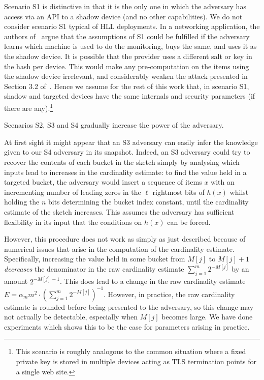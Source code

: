 \documentclass[sigconf, anonymous, dvipsnames]{acmart} %
\begin{document}
Scenario S1 is distinctive in that it is the only one in which the adversary has access via an API to a shadow device (and no other capabilities). We do not consider scenario S1 typical of HLL deployments. In a networking application, the authors of~\cite{hllvuln} argue that the assumptions of S1 could be fulfilled if the adversary learns which machine is used to do the monitoring, buys the same, and uses it as the shadow device. It is possible that the provider uses a different salt or key in the hash per device. This would make any pre-computation on the items using the shadow device irrelevant, and considerably weaken the attack presented in Section 3.2 of~\cite{hllvuln}. Hence we assume for the rest of this work that, in scenario S1, shadow and targeted devices have the same internals and security parameters (if there are any).\footnote{This scenario is roughly analogous to the common situation where a fixed private key is stored in multiple devices acting as TLS termination points for a single web site.}

Scenarios S2, S3 and S4 gradually increase the power of the adversary. 

At first sight it might appear that an S3 adversary can easily infer the knowledge given to our S4 adversary in its snapshot. Indeed, an S3 adversary could try to recover the contents of each bucket in the sketch simply by analysing which inputs lead to increases in the cardinality estimate: to find the value held in a targeted bucket, the adversary would insert a sequence of items $x$ with an incrementing number of leading zeros in the $\ell$ rightmost bits of $h(x)$ whilst holding the $n$ bits determining the bucket index constant, until the cardinality estimate of the sketch increases. This assumes the adversary has sufficient flexibility in its input that the conditions on $h(x)$ can be forced. 

However, this procedure does not work as simply as just described because of numerical issues that arise in the computation of the cardinality estimate. Specifically, increasing the value held in some bucket from $M[j]$ to $M[j]+1$ \emph{decreases} the denominator in the raw cardinality estimate $\sum_{j=1}^m2^{-M[j]}$ by an amount $2^{-M[j]-1}$. This does lead to a change in the raw cardinality estimate $E = \alpha_mm^2\cdot(\sum_{j=1}^m2^{-M[j]})^{-1}$. However, in practice, the raw cardinality estimate is rounded before being presented to the adversary, so this change may not actually be detectable, especially when $M[j]$ becomes large. We have done experiments which shows this to be the case for parameters arising in practice. 
\end{document}
